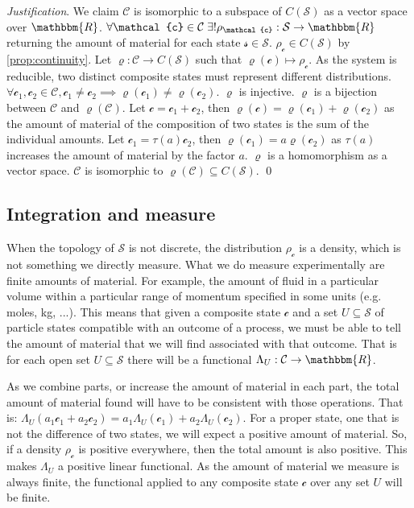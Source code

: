 \documentclass[aps,pra,10pt,twocolumn,floatfix,nofootinbib]{revtex4-1}
\numberwithin{equation}{section}
\theoremstyle{definition}
\newenvironment{justification}{\emph{Justification}.}{\qed}
\begin{document}
\begin{justification}
We claim $\mathcal{C}$ is isomorphic to a subspace of $C(\mathcal{S})$ as a vector space over $\mathbbm{R}$. $\forall \mathcal{c} \in \mathcal{C} \; \exists ! \rho_{\mathcal{c}}:\mathcal{S} \rightarrow \mathbbm{R}$ returning the amount of material for each state $\mathcal{s} \in \mathcal{S}$. $\rho_{\mathcal{c}} \in C(\mathcal{S})$ by \ref{prop:continuity}. Let $\varrho : \mathcal{C} \rightarrow C(\mathcal{S})$ such that $\varrho(\mathcal{c}) \mapsto \rho_\mathcal{c}$. 
As the system is reducible, two distinct composite states must represent different distributions. $\forall \mathcal{c_1}, \mathcal{c_2} \in \mathcal{C}, \mathcal{c_1} \neq \mathcal{c_2} \implies \varrho(\mathcal{c_1}) \neq \varrho(\mathcal{c_2})$. $\varrho$ is injective. $\varrho$ is a bijection between $\mathcal{C}$ and $\varrho(\mathcal{C})$. Let $\mathcal{c}=\mathcal{c}_1+\mathcal{c}_2$, then $\varrho(\mathcal{c})=\varrho(\mathcal{c}_1)+\varrho(\mathcal{c}_2)$ as the amount of material of the composition of two states is the sum of the individual amounts. Let $\mathcal{c}_1=\tau(a)\mathcal{c}_2$, then $\varrho(\mathcal{c}_1)=a \varrho(\mathcal{c}_2)$ as $\tau(a)$ increases the amount of material by the factor $a$. $\varrho$ is a homomorphism as a vector space. $\mathcal{C}$ is isomorphic to $\varrho(\mathcal{C}) \subseteq C(\mathcal{S})$.
\end{justification}

\subsection{Integration and measure}

When the topology of $\mathcal{S}$ is not discrete, the distribution $\rho_\mathcal{c}$ is a density, which is not something we directly measure. What we do measure experimentally are finite amounts of material. For example, the amount of fluid in a particular volume within a particular range of momentum specified in some units (e.g. moles, kg, ...). This means that given a composite state $\mathcal{c}$ and a set $U \subseteq \mathcal{S}$ of particle states compatible with an outcome of a process, we must be able to tell the amount of material that we will find associated with that outcome. That is for each open set $U \subseteq \mathcal{S}$ there will be a functional $\Lambda_U : \mathcal{C} \rightarrow \mathbbm{R}$.

As we combine parts, or increase the amount of material in each part, the total amount of material found will have to be consistent with those operations. That is: $\Lambda_U(a_1 \mathcal{c}_1 + a_2 \mathcal{c}_2) = a_1 \Lambda_U(\mathcal{c}_1) + a_2 \Lambda_U(\mathcal{c}_2)$. For a proper state, one that is not the difference of two states, we will expect a positive amount of material. So, if a density $\rho_\mathcal{c}$ is positive everywhere, then the total amount is also positive. This makes $\Lambda_U$ a positive linear functional. As the amount of material we measure is always finite, the functional applied to any composite state $\mathcal{c}$ over any set $U$ will be finite.
\end{document}
